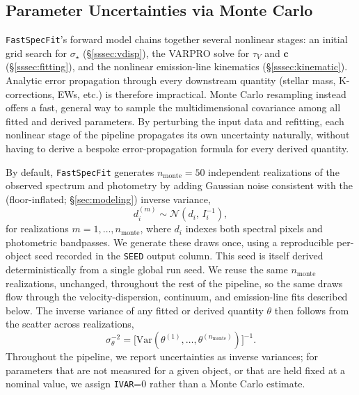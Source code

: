 \documentclass[modern,linenumbers]{aastex702}
\newcommand{\fastspecfit}{\texttt{FastSpecFit}}
\newcommand{\vdisp}{\ensuremath{\sigma_\star}}
\newcommand{\tauv}{\ensuremath{\tau_V}}
\begin{document}
\subsection{Parameter Uncertainties via Monte Carlo}
\label{ssec:uncertainties}

\fastspecfit{}'s forward model chains together several nonlinear
stages: an initial grid search for \vdisp{} (\S\ref{sssec:vdisp}), the
VARPRO solve for \tauv{} and $\mathbf{c}$ (\S\ref{sssec:fitting}), and
the nonlinear emission-line kinematics (\S\ref{sssec:kinematic}).
Analytic error propagation through every downstream quantity (stellar
mass, K-corrections, EWs, etc.) is therefore impractical. Monte Carlo
resampling instead offers a fast, general way to sample the
multidimensional covariance among all fitted and derived parameters.
By perturbing the input data and refitting, each nonlinear stage of
the pipeline propagates its own uncertainty naturally, without having
to derive a bespoke error-propagation formula for every derived
quantity.

By default, \fastspecfit{} generates $n_\mathrm{monte}=50$ independent
realizations of the observed spectrum and photometry by adding
Gaussian noise consistent with the (floor-inflated;
\S\ref{sec:modeling}) inverse variance,
\begin{equation}
  d_i^{(m)} \sim \mathcal{N}\left(d_i,\,I_i^{-1}\right),
  \label{eq:mc_draw}
\end{equation}
for realizations $m=1,\ldots,n_\mathrm{monte}$, where $d_i$ indexes
both spectral pixels and photometric bandpasses. We generate these
draws once, using a reproducible per-object seed recorded in the
\texttt{SEED} output column. This seed is itself derived
deterministically from a single global run seed. We reuse the same
$n_\mathrm{monte}$ realizations, unchanged, throughout the rest of the
pipeline, so the same draws flow through the velocity-dispersion,
continuum, and emission-line fits described below. The inverse
variance of any fitted or derived quantity $\theta$ then follows from
the scatter across realizations,
\begin{equation}
  \sigma_\theta^{-2}
  = \bigl[\mathrm{Var}(\theta^{(1)},\ldots,\theta^{(n_\mathrm{monte})})\bigr]^{-1}.
  \label{eq:mc_unc}
\end{equation}
Throughout the pipeline, we report uncertainties as inverse variances;
for parameters that are not measured for a given object, or that are
held fixed at a nominal value, we assign \texttt{IVAR}=0 rather than a
Monte Carlo estimate.
\end{document}

